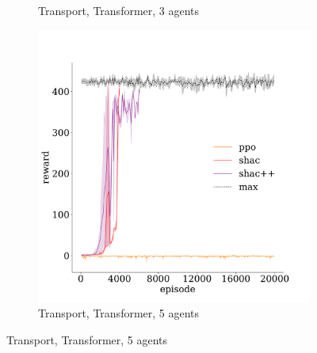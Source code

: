 \begin{figure}[!t]
\begin{subfigure}[b]{0.30\textwidth}
        \caption{Transport, Transformer, 3 agents}
        \label{fig:transport-transformer-3}
    \end{subfigure}
    \begin{subfigure}[b]{0.30\textwidth}
        \includegraphics[width=\textwidth]{figs/transport-5-transformer.pdf}
        \caption{Transport, Transformer, 5 agents}
        \label{fig:transport-transformer-5}
    \end{subfigure}


\end{figure}
